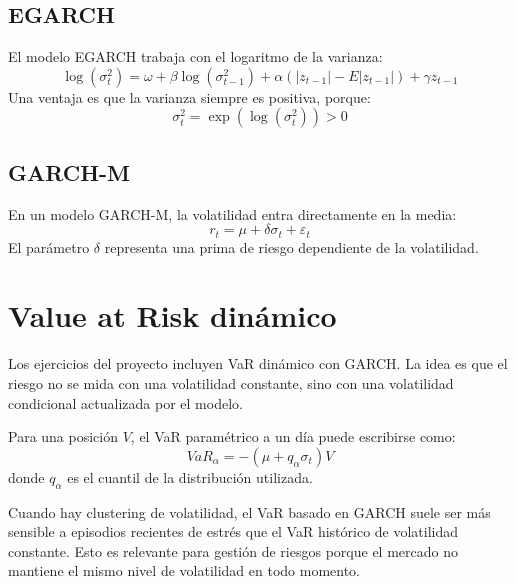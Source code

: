 \documentclass[12pt,a4paper]{article}
\begin{document}
\subsection{EGARCH}

\begin{latexcell}
El modelo EGARCH trabaja con el logaritmo de la varianza:
\[
\log(\sigma_t^2)
=
\omega+\beta\log(\sigma_{t-1}^2)
+\alpha\left(\left|z_{t-1}\right| - E|z_{t-1}|\right)
+\gamma z_{t-1}
\]
Una ventaja es que la varianza siempre es positiva, porque:
\[
\sigma_t^2 = \exp(\log(\sigma_t^2)) > 0
\]
\end{latexcell}

\subsection{GARCH-M}

\begin{latexcell}
En un modelo GARCH-M, la volatilidad entra directamente en la media:
\[
r_t = \mu + \delta \sigma_t + \varepsilon_t
\]
El parámetro \(\delta\) representa una prima de riesgo dependiente de la volatilidad.
\end{latexcell}

\section{Value at Risk dinámico}

\begin{markdowncell}
Los ejercicios del proyecto incluyen VaR dinámico con GARCH. La idea es que el riesgo no se mida con una volatilidad constante, sino con una volatilidad condicional actualizada por el modelo.
\end{markdowncell}

\begin{latexcell}
Para una posición \(V\), el VaR paramétrico a un día puede escribirse como:
\[
VaR_{\alpha} = -(\mu + q_{\alpha}\sigma_t)V
\]
donde \(q_{\alpha}\) es el cuantil de la distribución utilizada.
\end{latexcell}

\begin{interpretacion}
Cuando hay clustering de volatilidad, el VaR basado en GARCH suele ser más sensible a episodios recientes de estrés que el VaR histórico de volatilidad constante. Esto es relevante para gestión de riesgos porque el mercado no mantiene el mismo nivel de volatilidad en todo momento.
\end{interpretacion}
\end{document}

